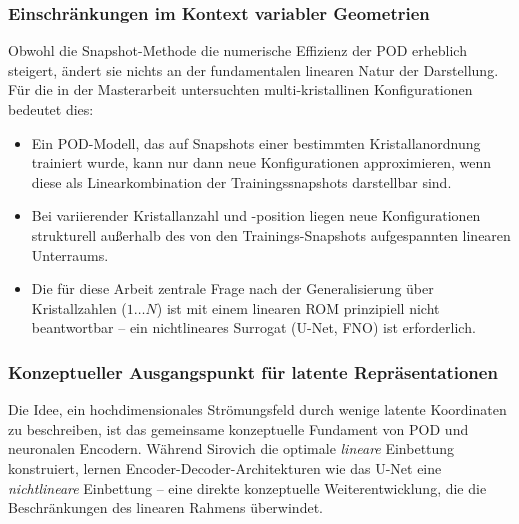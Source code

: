 \documentclass[a4paper,12pt]{article}
\begin{document}
\subsubsection*{Einschränkungen im Kontext variabler Geometrien}

Obwohl die Snapshot-Methode die numerische Effizienz der POD erheblich steigert, ändert sie nichts an der fundamentalen linearen Natur der Darstellung. Für die in der Masterarbeit untersuchten multi-kristallinen Konfigurationen bedeutet dies:
\begin{itemize}
    \item Ein POD-Modell, das auf Snapshots einer bestimmten Kristallanordnung trainiert wurde, kann nur dann neue Konfigurationen approximieren, wenn diese als Linearkombination der Trainingssnapshots darstellbar sind.
    \item Bei variierender Kristallanzahl und -position liegen neue Konfigurationen strukturell außerhalb des von den Trainings-Snapshots aufgespannten linearen Unterraums.
    \item Die für diese Arbeit zentrale Frage nach der Generalisierung über Kristallzahlen ($1 \ldots N$) ist mit einem linearen ROM prinzipiell nicht beantwortbar -- ein nichtlineares Surrogat (U-Net, FNO) ist erforderlich.
\end{itemize}

\subsubsection*{Konzeptueller Ausgangspunkt für latente Repräsentationen}

Die Idee, ein hochdimensionales Strömungsfeld durch wenige latente Koordinaten zu beschreiben, ist das gemeinsame konzeptuelle Fundament von POD und neuronalen Encodern. Während Sirovich die optimale \emph{lineare} Einbettung konstruiert, lernen Encoder-Decoder-Architekturen wie das U-Net eine \emph{nichtlineare} Einbettung -- eine direkte konzeptuelle Weiterentwicklung, die die Beschränkungen des linearen Rahmens überwindet.
\end{document}
